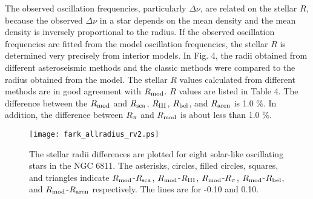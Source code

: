 \documentclass[a4paper,fleqn,usenatbib]{mnras}     %
\begin{document}
{The observed oscillation frequencies, 
particularly ${\Delta\nu}$,
 are related 
on the stellar $R$, because
the observed ${\Delta\nu}$ in a star 
depends on the mean density 
and the mean density is inversely 
proportional to the radius.
 If the observed oscillation frequencies are fitted 
from the model oscillation frequencies, the stellar $R$ is determined very precisely from interior models.
In Fig. 4, the radii obtained 
from different asteroseismic methods and 
the classic methods were compared to 
the radius obtained from the model.
The stellar $R$ values calculated 
from different methods 
are in good agreement with $R_{\rm mod}$.
$R$ values are listed in Table 4.
The difference between the 
$R_{\rm mod}$ and  $R_{\rm sca}$, $R_{\rm III}$,  $R_{\rm bel}$, and 
$R_{\rm aren}$ is 1.0 $\%$.
In addition, the difference between $R_{\rm \pi}$ and $R_{\rm mod}$ is about less than 1.0 $\%$. 
  

\begin{figure}
\begin{center}
\texttt{[image: fark\_allradius\_rv2.ps]}
        \caption{The stellar radii differences are plotted for eight solar-like oscillating stars in the  NGC 6811. The asterisks, circles, filled circles, squares, and triangles indicate ${R_{\rm mod}}$-${R_{\rm sca}}$, ${R_{\rm mod}}$-${R_{\rm III}}$, ${R_{\rm mod}}$-${R_{\rm \pi}}$, ${R_{\rm mod}}$-${R_{\rm bel}}$, and ${R_{\rm mod}}$-${R_{\rm aren}}$ respectively. The lines are for -0.10 and 0.10.}
\end{center}
\end{figure}


}
\end{document}
